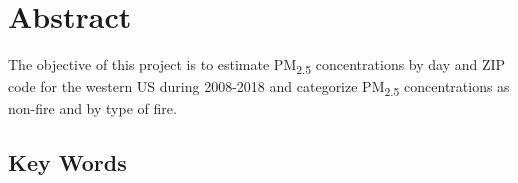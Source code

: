 \section{Abstract}

The objective of this project is to estimate PM\textsubscript{2.5} concentrations by day and ZIP code for the western US during 2008-2018 and categorize PM\textsubscript{2.5} concentrations as non-fire and by type of fire.

\subsection{Key Words}